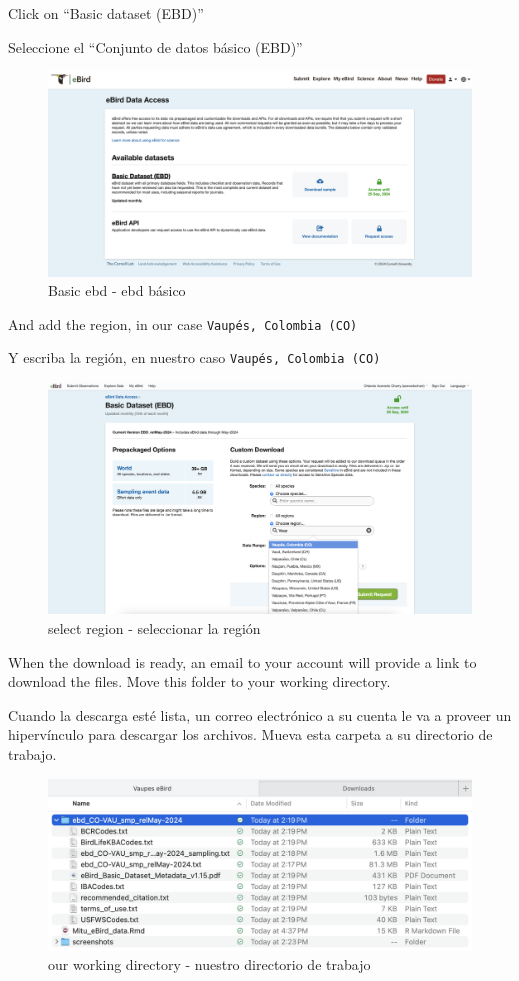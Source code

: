 \documentclass[
]{article}
\begin{document}
Click on ``Basic dataset (EBD)''

Seleccione el ``Conjunto de datos básico (EBD)''

\begin{figure}
\centering
\includegraphics{screenshots/eBird3.png}
\caption{Basic ebd - ebd básico}
\end{figure}

And add the region, in our case \texttt{Vaupés,\ Colombia\ (CO)}

Y escriba la región, en nuestro caso \texttt{Vaupés,\ Colombia\ (CO)}

\begin{figure}
\centering
\includegraphics{screenshots/eBird4.png}
\caption{select region - seleccionar la región}
\end{figure}

When the download is ready, an email to your account will provide a link
to download the files. Move this folder to your working directory.

Cuando la descarga esté lista, un correo electrónico a su cuenta le va a
proveer un hipervínculo para descargar los archivos. Mueva esta carpeta
a su directorio de trabajo.

\begin{figure}
\centering
\includegraphics{screenshots/eBird5.png}
\caption{our working directory - nuestro directorio de trabajo}
\end{figure}
\end{document}
